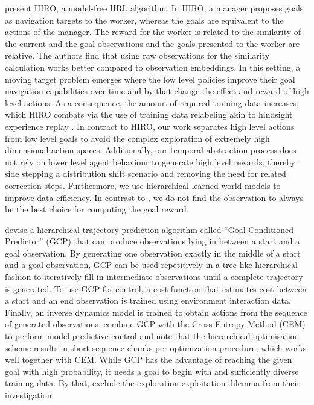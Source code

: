 \documentclass{article}
\begin{document}
\citet{nachum2018data} present HIRO, a model-free HRL algorithm. In HIRO, a manager proposes goals as navigation targets to the worker, whereas the goals are equivalent to the actions of the manager. The reward for the worker is related to the similarity of the current and the goal observations and the goals presented to the worker are relative. The authors find that using raw observations for the similarity calculation works better compared to observation embeddings. In this setting, a moving target problem emerges where the low level policies improve their goal navigation capabilities over time and by that change the effect and reward of high level actions. As a consequence, the amount of required training data increases, which HIRO combats via the use of training data relabeling akin to hindsight experience replay \citep{andrychowicz2018hindsight}. In contract to HIRO, our work separates high level actions from low level goals to avoid the complex exploration of extremely high dimensional action spaces. Additionally, our temporal abstraction process does not rely on lower level agent behaviour to generate high level rewards, thereby side stepping a distribution shift scenario and removing the need for related correction steps. Furthermore, we use hierarchical learned world models to improve data efficiency. In contrast to \citet{nachum2018data}, we do not find the observation to always be the best choice for computing the goal reward.


\citet{pertsch2020long} devise a hierarchical trajectory prediction algorithm called ``Goal-Conditioned Predictor'' (GCP) that can produce observations lying in between a start and a goal observation. By generating one observation exactly in the middle of a start and a goal observation, GCP can be used repetitively in a tree-like hierarchical fashion to iteratively fill in intermediate observations until a complete trajectory is generated. To use GCP for control, a cost function that estimates cost between a start and an end observation is trained using environment interaction data. Finally, an inverse dynamics model is trained to obtain actions from the sequence of generated observations. \citet{pertsch2020long} combine GCP with the Cross-Entropy Method (CEM) \citep{rubinstein1997optimization} to perform model predictive control and note that the hierarchical optimisation scheme results in short sequence chunks per optimization procedure, which works well together with CEM. While GCP has the advantage of reaching the given goal with high probability, it needs a goal to begin with and sufficiently diverse training data. By that, \citet{pertsch2020long} exclude the exploration-exploitation dilemma from their investigation.
\end{document}
